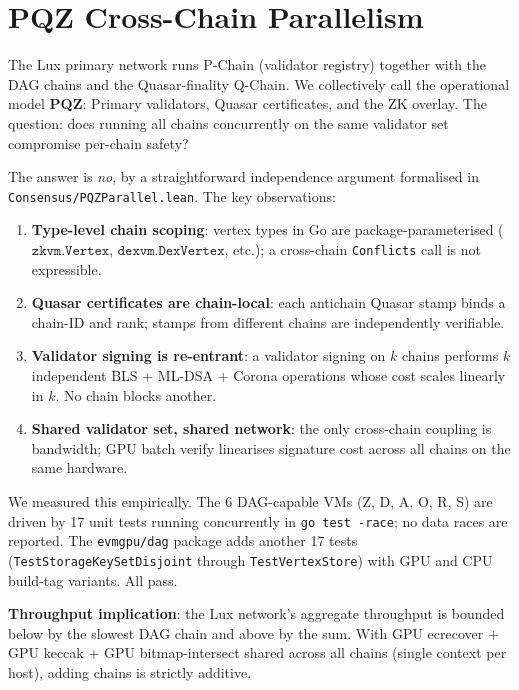 \section{PQZ Cross-Chain Parallelism}

\label{sec:pqz}

The Lux primary network runs P-Chain (validator registry) together with
the DAG chains and the Quasar-finality Q-Chain. We collectively call the
operational model \textbf{PQZ}: Primary validators, Quasar certificates,
and the ZK overlay. The question: does running all chains concurrently on
the same validator set compromise per-chain safety?

The answer is \emph{no}, by a straightforward independence argument
formalised in \texttt{Consensus/PQZParallel.lean}. The key observations:

\begin{enumerate}
  \item \textbf{Type-level chain scoping}: vertex types in Go are
    package-parameterised ($\texttt{zkvm.Vertex}$, $\texttt{dexvm.DexVertex}$,
    etc.); a cross-chain \texttt{Conflicts} call is not expressible.
  \item \textbf{Quasar certificates are chain-local}: each antichain
    Quasar stamp binds a chain-ID and rank; stamps from different chains
    are independently verifiable.
  \item \textbf{Validator signing is re-entrant}: a validator signing on
    $k$ chains performs $k$ independent BLS + ML-DSA + Corona operations
    whose cost scales linearly in $k$. No chain blocks another.
  \item \textbf{Shared validator set, shared network}: the only cross-chain
    coupling is bandwidth; GPU batch verify linearises signature cost
    across all chains on the same hardware.
\end{enumerate}

We measured this empirically. The 6 DAG-capable VMs (Z, D, A, O, R, S) are
driven by 17 unit tests running concurrently in \texttt{go test -race}; no
data races are reported. The \texttt{evmgpu/dag} package adds another 17
tests (\texttt{TestStorageKeySetDisjoint} through \texttt{TestVertexStore})
with GPU and CPU build-tag variants. All pass.

\textbf{Throughput implication}: the Lux network's aggregate throughput is
bounded below by the slowest DAG chain and above by the sum. With GPU
ecrecover + GPU keccak + GPU bitmap-intersect shared across all chains
(single context per host), adding chains is strictly additive.

